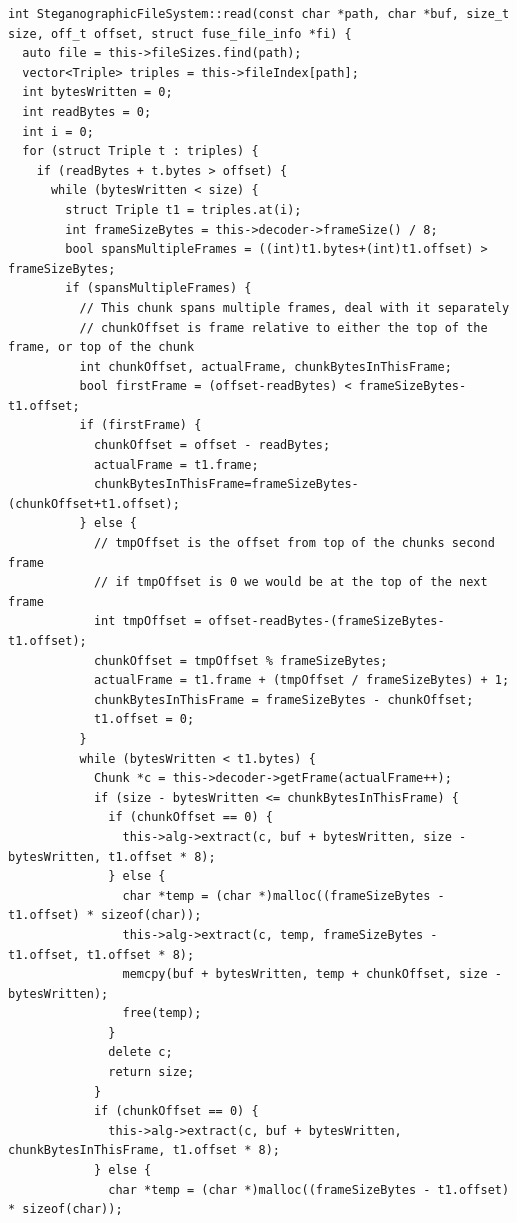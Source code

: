 \documentclass[paper=a4, fontsize=11pt,twoside]{scrartcl}
\numberwithin{table}{section}
\numberwithin{figure}{section}
\numberwithin{algorithm}{section}
\begin{document}
\begin{lstlisting}[caption={\texttt{FUSE} read function call implementation.}, frame=single, label=readfs,showstringspaces=false,upquote=true]
int SteganographicFileSystem::read(const char *path, char *buf, size_t size, off_t offset, struct fuse_file_info *fi) {
  auto file = this->fileSizes.find(path);
  vector<Triple> triples = this->fileIndex[path];
  int bytesWritten = 0;
  int readBytes = 0;
  int i = 0;
  for (struct Triple t : triples) {
    if (readBytes + t.bytes > offset) {
      while (bytesWritten < size) {
        struct Triple t1 = triples.at(i);
        int frameSizeBytes = this->decoder->frameSize() / 8;
        bool spansMultipleFrames = ((int)t1.bytes+(int)t1.offset) > frameSizeBytes;
        if (spansMultipleFrames) {
          // This chunk spans multiple frames, deal with it separately
          // chunkOffset is frame relative to either the top of the frame, or top of the chunk
          int chunkOffset, actualFrame, chunkBytesInThisFrame;
          bool firstFrame = (offset-readBytes) < frameSizeBytes-t1.offset;
          if (firstFrame) {
            chunkOffset = offset - readBytes;
            actualFrame = t1.frame;
            chunkBytesInThisFrame=frameSizeBytes-(chunkOffset+t1.offset);
          } else {
            // tmpOffset is the offset from top of the chunks second frame
            // if tmpOffset is 0 we would be at the top of the next frame
            int tmpOffset = offset-readBytes-(frameSizeBytes-t1.offset);
            chunkOffset = tmpOffset % frameSizeBytes;
            actualFrame = t1.frame + (tmpOffset / frameSizeBytes) + 1;
            chunkBytesInThisFrame = frameSizeBytes - chunkOffset;
            t1.offset = 0;
          }
          while (bytesWritten < t1.bytes) {
            Chunk *c = this->decoder->getFrame(actualFrame++);
            if (size - bytesWritten <= chunkBytesInThisFrame) {
              if (chunkOffset == 0) {
                this->alg->extract(c, buf + bytesWritten, size - bytesWritten, t1.offset * 8);
              } else {
                char *temp = (char *)malloc((frameSizeBytes - t1.offset) * sizeof(char));
                this->alg->extract(c, temp, frameSizeBytes - t1.offset, t1.offset * 8);
                memcpy(buf + bytesWritten, temp + chunkOffset, size - bytesWritten);
                free(temp);
              }
              delete c;
              return size;
            }
            if (chunkOffset == 0) {
              this->alg->extract(c, buf + bytesWritten, chunkBytesInThisFrame, t1.offset * 8);
            } else {
              char *temp = (char *)malloc((frameSizeBytes - t1.offset) * sizeof(char));

\end{lstlisting}
\end{document}
